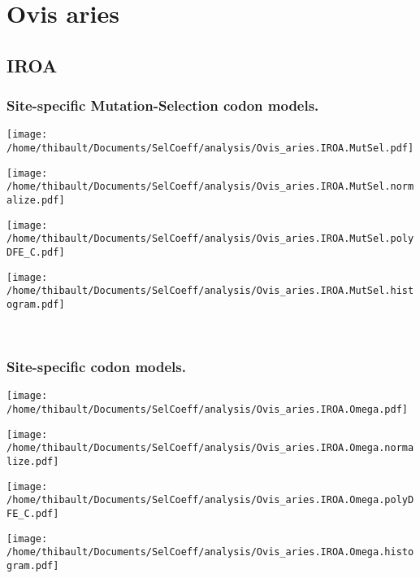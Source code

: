 \section{Ovis aries} 
 
\subsection{IROA} 
 
\subsubsection*{Site-specific Mutation-Selection codon models.} 
\begin{minipage}{0.49\linewidth} 
\texttt{[image: /home/thibault/Documents/SelCoeff/analysis/Ovis\_aries.IROA.MutSel.pdf]} 
\end{minipage}
\begin{minipage}{0.49\linewidth} 
\texttt{[image: /home/thibault/Documents/SelCoeff/analysis/Ovis\_aries.IROA.MutSel.normalize.pdf]} 
\end{minipage}
\begin{minipage}{0.49\linewidth} 
\texttt{[image: /home/thibault/Documents/SelCoeff/analysis/Ovis\_aries.IROA.MutSel.polyDFE\_C.pdf]} 
\end{minipage}
\begin{minipage}{0.49\linewidth} 
\texttt{[image: /home/thibault/Documents/SelCoeff/analysis/Ovis\_aries.IROA.MutSel.histogram.pdf]} 
\end{minipage}
\\ 
\subsubsection*{Site-specific codon models.} 
\begin{minipage}{0.49\linewidth} 
\texttt{[image: /home/thibault/Documents/SelCoeff/analysis/Ovis\_aries.IROA.Omega.pdf]} 
\end{minipage}
\begin{minipage}{0.49\linewidth} 
\texttt{[image: /home/thibault/Documents/SelCoeff/analysis/Ovis\_aries.IROA.Omega.normalize.pdf]} 
\end{minipage}
\begin{minipage}{0.49\linewidth} 
\texttt{[image: /home/thibault/Documents/SelCoeff/analysis/Ovis\_aries.IROA.Omega.polyDFE\_C.pdf]} 
\end{minipage}
\begin{minipage}{0.49\linewidth} 
\texttt{[image: /home/thibault/Documents/SelCoeff/analysis/Ovis\_aries.IROA.Omega.histogram.pdf]} 
\end{minipage}
\\ 

